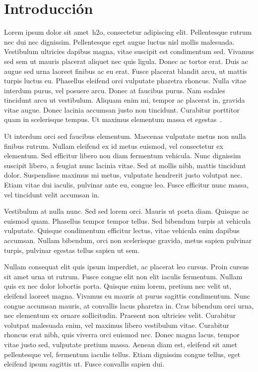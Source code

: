 \chapter{Introducción}

Lorem ipsum dolor sit amet~\ac{h2o}, consectetur adipiscing elit. Pellentesque rutrum nec dui nec dignissim. Pellentesque eget augue luctus nisl mollis malesuada. Vestibulum ultricies dapibus magna, vitae suscipit est condimentum sed. Vivamus sed sem ut mauris placerat aliquet nec quis ligula. Donec ac tortor erat. Duis ac augue sed urna laoreet finibus ac eu erat. Fusce placerat blandit arcu, ut mattis turpis luctus eu. Phasellus eleifend orci vulputate pharetra rhoncus. Nulla vitae interdum purus, vel posuere arcu. Donec at faucibus purus. Nam sodales tincidunt arcu ut vestibulum. Aliquam enim mi, tempor ac placerat in, gravida vitae augue. Donec lacinia accumsan justo non tincidunt. Curabitur porttitor quam in scelerisque tempus. Ut maximus elementum massa et egestas~\cite{DeferredRouting}.

Ut interdum orci sed faucibus elementum. Maecenas vulputate metus non nulla finibus rutrum. Nullam eleifend ex id metus euismod, vel consectetur ex elementum. Sed efficitur libero non diam fermentum vehicula. Nunc dignissim suscipit libero, a feugiat nunc lacinia vitae. Sed at mollis nibh, mattis tincidunt dolor. Suspendisse maximus mi metus, vulputate hendrerit justo volutpat nec. Etiam vitae dui iaculis, pulvinar ante eu, congue leo. Fusce efficitur nunc massa, vel tincidunt velit accumsan in.

Vestibulum at nulla nunc. Sed sed lorem orci. Mauris ut porta diam. Quisque ac euismod quam. Phasellus tempor tempor tellus. Sed bibendum turpis at vehicula vulputate. Quisque condimentum efficitur lectus, vitae vehicula enim dapibus accumsan. Nullam bibendum, orci non scelerisque gravida, metus sapien pulvinar turpis, pulvinar egestas tellus sapien ut sem.

Nullam consequat elit quis ipsum imperdiet, ac placerat leo cursus. Proin cursus sit amet urna ut rutrum. Fusce congue elit non elit iaculis fermentum. Nullam quis ex nec dolor lobortis porta. Quisque enim lorem, pretium nec velit ut, eleifend laoreet magna. Vivamus eu mauris at purus sagittis condimentum. Nunc congue accumsan mauris, at convallis lacus pharetra in. Cras bibendum orci urna, nec elementum ex ornare sollicitudin. Praesent non ultricies velit. Curabitur volutpat malesuada enim, vel maximus libero vestibulum vitae. Curabitur rhoncus erat nibh, quis viverra orci euismod nec. Donec magna lacus, tempor vitae justo sed, vulputate pretium massa. Aenean diam est, eleifend sit amet pellentesque vel, fermentum iaculis tellus. Etiam dignissim congue tellus, eget eleifend ipsum sagittis ut. Fusce convallis sapien dui.

